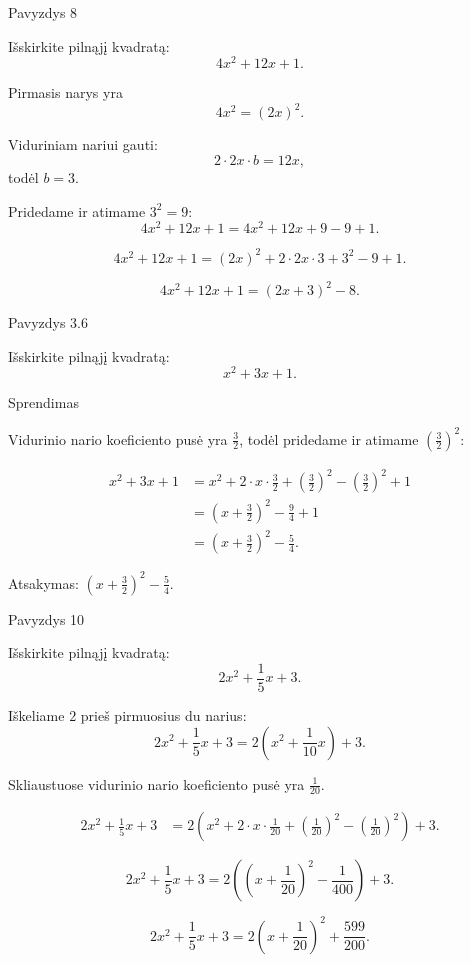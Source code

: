 \documentclass[aspectratio=169,11pt]{beamer}
\begin{document}
\begin{frame}{Pavyzdys 8}

Išskirkite pilnąjį kvadratą:
\[
4x^2+12x+1.
\]

\pause

Pirmasis narys yra
\[
4x^2=(2x)^2.
\]

\pause

Viduriniam nariui gauti:
\[
2\cdot2x\cdot b=12x,
\]
todėl $b=3$.

\pause

Pridedame ir atimame $3^2=9$:
\[
4x^2+12x+1=4x^2+12x+9-9+1.
\]

\pause

\[
4x^2+12x+1=(2x)^2+2\cdot2x\cdot3+3^2-9+1.
\]

\pause

\[
4x^2+12x+1=(2x+3)^2-8.
\]

\end{frame}

\begin{frame}{Pavyzdys 3.6}

Išskirkite pilnąjį kvadratą:
\[
x^2+3x+1.
\]

\pause

Sprendimas

Vidurinio nario koeficiento pusė yra $\frac{3}{2}$, todėl pridedame ir atimame $\left(\frac{3}{2}\right)^2$:

\[
\begin{aligned}
x^2+3x+1
&=x^2+2\cdot x\cdot\frac{3}{2}+\left(\frac{3}{2}\right)^2-\left(\frac{3}{2}\right)^2+1 \\
&=\left(x+\frac{3}{2}\right)^2-\frac{9}{4}+1 \\
&=\left(x+\frac{3}{2}\right)^2-\frac{5}{4}.
\end{aligned}
\]

\pause

Atsakymas: $\left(x+\frac{3}{2}\right)^2-\frac{5}{4}$.

\end{frame}

\begin{frame}{Pavyzdys 10}
\small

Išskirkite pilnąjį kvadratą:
\[
2x^2+\frac15x+3.
\]

\pause

Iškeliame $2$ prieš pirmuosius du narius:
\[
2x^2+\frac15x+3
=
2\left(x^2+\frac1{10}x\right)+3.
\]

\pause

Skliaustuose vidurinio nario koeficiento pusė yra $\frac1{20}$.

\pause

\[
\begin{aligned}
2x^2+\frac15x+3
&=2\left(
x^2+2\cdot x\cdot\frac1{20}
+\left(\frac1{20}\right)^2
-\left(\frac1{20}\right)^2
\right)+3.
\end{aligned}
\]

\pause

\[
2x^2+\frac15x+3
=
2\left(
\left(x+\frac1{20}\right)^2-\frac1{400}
\right)+3.
\]

\pause

\[
2x^2+\frac15x+3
=
2\left(x+\frac1{20}\right)^2+\frac{599}{200}.
\]

\end{frame}
\end{document}
